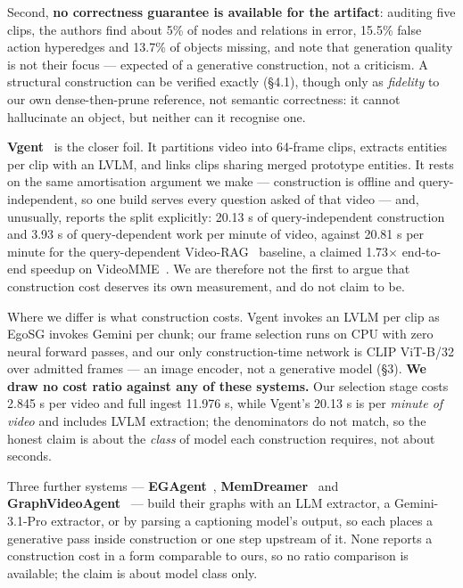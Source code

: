 \documentclass[sigconf,review,anonymous]{acmart}
\begin{document}
Second, \textbf{no correctness guarantee is available for the artifact}: auditing five clips,
the authors find about 5\% of nodes and relations in error, 15.5\% false action hyperedges and
13.7\% of objects missing, and note that generation quality is not their focus --- expected of
a generative construction, not a criticism. A structural construction can be verified exactly
(§4.1), though only as \emph{fidelity} to our own dense-then-prune reference, not semantic
correctness: it cannot hallucinate an object, but neither can it recognise one.

\textbf{Vgent}~\cite{shen2025vgent} is the closer foil. It partitions video into 64-frame
clips, extracts entities per clip with an LVLM, and links clips sharing merged prototype
entities. It rests on the same amortisation argument we make --- construction is offline and
query-independent, so one build serves every question asked of that video --- and, unusually,
reports the split explicitly: 20.13 s of query-independent construction and 3.93 s of
query-dependent work per minute of video, against 20.81 s per minute for the query-dependent
Video-RAG~\cite{luo2024videorag} baseline, a claimed 1.73\ensuremath{\times} end-to-end speedup on VideoMME~\cite{fu2025videomme}. We are therefore not the
first to argue that construction cost deserves its own measurement, and do not claim to be.

Where we differ is what construction costs. Vgent invokes an LVLM per clip as EgoSG invokes
Gemini per chunk; our frame selection runs on CPU with zero neural forward passes, and our
only construction-time network is CLIP ViT-B/32 over admitted frames --- an image encoder, not
a generative model (§3). \textbf{We draw no cost ratio against any of these systems.} Our
selection stage costs 2.845 s per video and full ingest 11.976 s, while Vgent's 20.13 s is
per \emph{minute of video} and includes LVLM extraction; the denominators do not match, so the
honest claim is about the \emph{class} of model each construction requires, not about seconds.

Three further systems --- \textbf{EGAgent}~\cite{rege2026egagent}, \textbf{MemDreamer}~\cite{chen2026memdreamer}
and \textbf{GraphVideoAgent}~\cite{chu2025graphvideoagent} --- build their graphs with an LLM extractor,
a Gemini-3.1-Pro extractor, or by parsing a captioning model's output, so each places a
generative pass inside construction or one step upstream of it. None reports a
construction cost in a form comparable to ours, so no ratio comparison is available; the claim is about model
class only.
\end{document}
